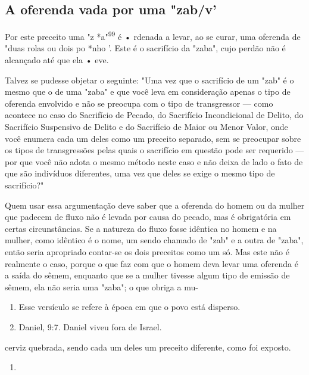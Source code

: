 \begin{itemize}
\begin{enumrate}
\begin{itemize}
\begin{itemize}
\section{A oferenda vada por uma "zab/v'}

Por este preceito uma "z *a"\textsuperscript{99} é • rdenada a levar, ao
se curar, uma oferenda de "duas rolas ou dois po *nho '. Este é o
sacrifício da "zaba", cu­jo perdão não é alcançado até que ela • eve.

Talvez se pudesse objetar o seguinte: "Uma vez que o sacrifício de um
"zab" é o mesmo que o de uma "zaba" e que você leva em consideração
apenas o tipo de oferenda envolvido e não se preocupa com o tipo de
trans­gressor --- como acontece no caso do Sacrifício de Pecado, do
Sacrifício Incon­dicional de Delito, do Sacrifício Suspensivo de Delito
e do Sacrifício de Maior ou Menor Valor, onde você enumera cada um deles
como um preceito separa­do, sem se preocupar sobre os tipos de
transgressões pelas quais o sacrifício em questão pode ser requerido ---
por que você não adota o mesmo método neste caso e não deixa de lado o
fato de que são indivíduos diferentes, uma vez que deles se exige o
mesmo tipo de sacrifício?"

Quem usar essa argumentação deve saber que a oferenda do homem ou da
mulher que padecem de fluxo não é levada por causa do pecado, mas é
obrigatória em certas circunstâncias. Se a natureza do fluxo fosse
idêntica no homem e na mulher, como idêntico é o nome, um sendo chamado
de "zab" e a outra de "zaba", então seria apropriado contar-se os dois
preceitos como um só. Mas este não é realmente o caso, porque o que faz
com que o homem deva levar uma oferenda é a saída do sêmem, enquanto que
se a mulher tivesse algum tipo de emissão de sêmem, ela não seria uma
"zaba"; o que obriga a mu-


\begin{enumerate}
\def\labelenumi{\arabic{enumi}.}
\setcounter{enumi}{95}
\item
 
 Esse versículo se refere à época em que o povo está disperso.
 
\item
 
 Daniel, 9:7. Daniel viveu fora de Israel.
 
\end{enumerate}


cerviz quebrada, sendo cada um deles um preceito diferente, como foi
exposto.


\begin{enumerate}
\def\labelenumi{\arabic{enumi}.}
\setcounter{enumi}{97}
\item
 

\end{enumerate}
\end{itemize}
\end{itemize}
\end{enumrate}
\end{itemize}

